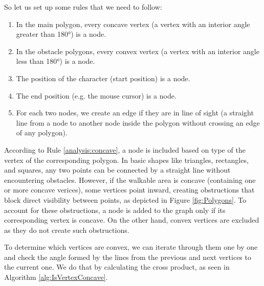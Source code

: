 So let us set up some rules that we need to follow:

\begin{enumerate}[label=\color{purple}\textbf{R{\arabic*}}]
  \item \label{analysis:concave} In the main polygon, every concave vertex (a vertex with an interior angle greater than 180°) is a node.
  \item \label{analysis:convex} In the obstacle polygons, every convex vertex (a vertex with an interior angle less than 180°) is a node.
  \item \label{analysis:start} The position of the character (start position) is a node.
  \item \label{analysis:end} The end position (e.g. the mouse cursor) is a node.
  \item \label{analysis:LOS} For each two nodes, we create an edge if they are in line of sight (a straight line from a node to another node inside the polygon without crossing an edge of any polygon). 
\end{enumerate}

According to Rule \ref{analysis:concave}, a node is included based on type of the vertex of the corresponding polygon. In basic shapes like triangles, rectangles, and squares, any two points can be connected by a straight line without encountering obstacles. However, if the walkable area is concave (containing one or more concave verices), some vertices point inward, creating obstructions that block direct visibility between points, as depicted in Figure \ref{fig:Polygons}. To account for these obstructions, a node is added to the graph only if its corresponding vertex is concave. On the other hand, convex vertices are excluded as they do not create such obstructions.


To determine which vertices are convex, we can iterate through them one by one and check the angle formed by the lines from the previous and next vertices to the current one. We do that by calculating the cross product, as seen in Algorithm \ref{alg:IsVertexConcave}.

